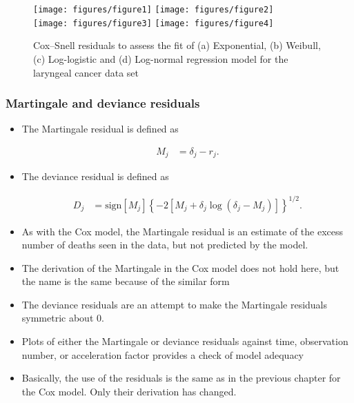 \documentclass[10pt]{article}\usepackage[]{graphicx}\usepackage[]{xcolor}
\theoremstyle{definition}
\numberwithin{equation}{subsection}
\numberwithin{figure}{section}
\numberwithin{table}{subsection}
\numberwithin{Report}{section}
\numberwithin{Example}{subsection}
\begin{document}
\begin{figure}[!ht]
  \centering
  \texttt{[image: figures/figure1]}\quad
  \texttt{[image: figures/figure2]}\\
  \texttt{[image: figures/figure3]}\quad
  \texttt{[image: figures/figure4]}
  \caption{Cox–Snell residuals to assess the fit of (a) Exponential, (b) Weibull, (c) Log-logistic and (d) Log-normal regression model for the laryngeal cancer data set}
  \label{fig:sub1}
\end{figure}

\newpage 

\subsubsection{Martingale and deviance residuals}
\begin{itemize}
\item The Martingale residual is defined as


\begin{align*}
M_{j} & =\delta_{j}-r_{j}.
\end{align*}


\item The deviance residual is defined as


\begin{align*}
D_{j} & =\mbox{sign}[M_{j}]\left\{ -2\left[M_{j}+\delta_{j}\log(\delta_{j}-M_{j})\right]\right\} ^{1/2}.
\end{align*}


\item As with the Cox model, the Martingale residual is an estimate of the
excess number of deaths seen in the data, but not predicted by the
model.
\item The derivation of the Martingale in the Cox model does not hold here,
but the name is the same because of the similar form
\item The deviance residuals are an attempt to make the Martingale residuals
symmetric about $0$.
\item Plots of either the Martingale or deviance residuals against time,
observation number, or acceleration factor provides a check of model
adequacy
\item Basically, the use of the residuals is the same as in the previous
chapter for the Cox model. Only their derivation has changed.\end{itemize}
\end{document}
